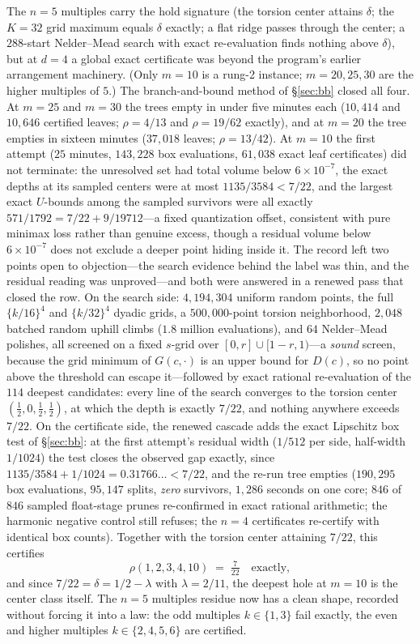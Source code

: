 The $n=5$ multiples carry the hold signature (the torsion center
attains $\delta$; the $K=32$ grid maximum equals $\delta$ exactly; a
flat ridge passes through the center; a $288$-start Nelder--Mead search
with exact re-evaluation finds nothing above $\delta$), but at $d=4$ a
global exact certificate was beyond the program's earlier arrangement
machinery. (Only $m=10$ is a rung-2 instance; $m=20,25,30$ are the
higher multiples of $5$.) The branch-and-bound method of \S\ref{sec:bb}
closed all four. At $m=25$ and $m=30$ the trees empty in under five
minutes each ($10{,}414$ and $10{,}646$ certified leaves; $\rho=4/13$
and $\rho=19/62$ exactly), and at $m=20$ the tree empties in sixteen
minutes ($37{,}018$ leaves; $\rho=13/42$). At $m=10$ the first attempt
($25$ minutes, $143{,}228$ box evaluations, $61{,}038$ exact leaf
certificates) did not terminate: the unresolved set had total volume
below $6\times10^{-7}$, the exact depths at its sampled centers were at
most $1135/3584<7/22$, and the largest exact $U$-bounds among the
sampled survivors were all exactly $571/1792=7/22+9/19712$---a fixed
quantization offset, consistent with pure minimax loss rather than
genuine excess, though a residual volume below $6\times10^{-7}$ does not
exclude a deeper point hiding inside it. The record left two points
open to objection---the search evidence behind the label was thin, and
the residual reading was unproved---and both were answered in a renewed
pass that closed the row. On the search side: $4{,}194{,}304$ uniform
random points, the full $\{k/16\}^4$ and $\{k/32\}^4$ dyadic grids, a
$500{,}000$-point torsion neighborhood, $2{,}048$ batched random uphill
climbs ($1.8$ million evaluations), and $64$ Nelder--Mead polishes, all
screened on a fixed $s$-grid over $[0,r]\cup[1-r,1)$---a \emph{sound}
screen, because the grid minimum of $G(c,\cdot)$ is an upper bound for
$D(c)$, so no point above the threshold can escape it---followed by
exact rational re-evaluation of the $114$ deepest candidates: every
line of the search converges to the torsion center
$(\tfrac12,0,\tfrac12,\tfrac12)$, at which the depth is exactly $7/22$,
and nothing anywhere exceeds $7/22$. On the certificate side, the
renewed cascade adds the exact Lipschitz box test of \S\ref{sec:bb}:
at the first attempt's residual width ($1/512$ per side, half-width
$1/1024$) the test closes the observed gap exactly, since
$1135/3584+1/1024=0.31766\ldots<7/22$, and the re-run tree empties
($190{,}295$ box evaluations, $95{,}147$ splits, \emph{zero} survivors,
$1{,}286$ seconds on one core; $846$ of $846$ sampled float-stage
prunes re-confirmed in exact rational arithmetic; the harmonic negative
control still refuses; the $n=4$ certificates re-certify with identical
box counts). Together with the torsion center attaining $7/22$, this
certifies
\[
\rho(1,2,3,4,10)\;=\;\tfrac{7}{22}\quad\text{exactly},
\]
and since $7/22=\delta=1/2-\lambda$ with $\lambda=2/11$, the deepest
hole at $m=10$ is the center class itself. The $n=5$ multiples residue
now has a clean shape, recorded without forcing it into a law: the odd
multiples $k\in\{1,3\}$ fail exactly, the even and higher multiples
$k\in\{2,4,5,6\}$ are certified.

